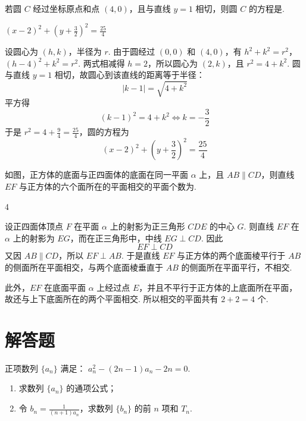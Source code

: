 \begin{problem}
若圆 \(C\) 经过坐标原点和点 \((4,0)\)，且与直线 \(y = 1\) 相切，则圆 \(C\) 的方程是\fillinblank{}.
\end{problem}

\begin{answer}
\((x-2)^{2} + \left(y + \frac{3}{2}\right)^{2} = \frac{25}{4}\)
\end{answer}

\begin{solution}
设圆心为 \((h,k)\)，半径为 \(r\). 由于圆经过 \((0,0)\) 和 \((4,0)\)，有
\(h^{2}+k^{2}=r^{2}\)，\((h-4)^{2}+k^{2}=r^{2}\).
两式相减得 \(h=2\)，所以圆心为 \((2,k)\)，且 \(r^{2}=4+k^{2}\). 圆与直线 \(y=1\) 相切，故圆心到该直线的距离等于半径：
\[
|k-1|=\sqrt{4+k^{2}}
\]
平方得
\[
(k-1)^{2}=4+k^{2}\iff k=-\frac32
\]
于是 \(r^{2}=4+\frac94=\frac{25}{4}\)，圆的方程为
\[
\left(x-2\right)^{2}+\left(y+\frac32\right)^{2}=\frac{25}{4}
\]
\end{solution}

\begin{problem}
如图，正方体的底面与正四面体的底面在同一平面 \(\alpha\) 上，且 \(AB \parallel CD\)，则直线 \(EF\) 与正方体的六个面所在的平面相交的平面个数为\fillinblank{}.
\end{problem}

\begin{answer}
4
\end{answer}

\begin{solution}
设正四面体顶点 \(F\) 在平面 \(\alpha\) 上的射影为正三角形 \(CDE\) 的中心 \(G\). 则直线 \(EF\) 在 \(\alpha\) 上的射影为 \(EG\)，而在正三角形中，中线 \(EG\perp CD\). 因此
\[
EF\perp CD
\]
又因 \(AB\parallel CD\)，所以 \(EF\perp AB\). 于是直线 \(EF\) 与正方体的两个底面棱平行于 \(AB\) 的侧面所在平面相交，与两个底面棱垂直于 \(AB\) 的侧面所在平面平行，不相交.

此外，\(EF\) 在底面平面 \(\alpha\) 上经过点 \(E\)，并且不平行于正方体的上底面所在平面，故还与上下底面所在的两个平面相交. 所以相交的平面共有 \(2+2=4\) 个.
\end{solution}

\section{解答题}

\begin{problem}
正项数列 \(\{a_{n}\}\) 满足： \(a_{n}^{2} - (2n - 1)a_{n} - 2n = 0\).
\begin{enumerate}
\item 求数列 \( \{a_{n}\} \) 的通项公式；
\item 令 \( b_{n} = \frac{1}{(n + 1)a_{n}} \)，求数列 \( \{b_{n}\} \) 的前 \( n \) 项和 \( T_{n} \).
\end{enumerate}
\end{problem}

